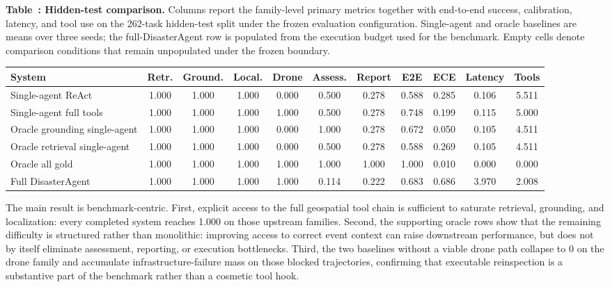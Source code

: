 \documentclass{article}
\begin{document}
\label{tab:main-results}
\begin{center}
    \scriptsize
    \setlength{\tabcolsep}{2.5pt}
    \textbf{Table~\thetable: Hidden-test comparison.} Columns report the family-level primary metrics together with end-to-end success, calibration, latency, and tool use on the 262-task hidden-test split under the frozen evaluation configuration. Single-agent and oracle baselines are means over three seeds; the full-DisasterAgent row is populated from the execution budget used for the benchmark. Empty cells denote comparison conditions that remain unpopulated under the frozen boundary.
    \vspace{0.35em}

    \begin{tabular}{lcccccccccc}
        \toprule
        System & Retr. & Ground. & Local. & Drone & Assess. & Report & E2E & ECE & Latency & Tools \\
        \midrule
        Single-agent ReAct & 1.000 & 1.000 & 1.000 & 0.000 & 0.500 & 0.278 & 0.588 & 0.285 & 0.106 & 5.511 \\
        Single-agent full tools & 1.000 & 1.000 & 1.000 & 1.000 & 0.500 & 0.278 & 0.748 & 0.199 & 0.115 & 5.000 \\
        Oracle grounding single-agent & 1.000 & 1.000 & 1.000 & 0.000 & 1.000 & 0.278 & 0.672 & 0.050 & 0.105 & 4.511 \\
        Oracle retrieval single-agent & 1.000 & 1.000 & 1.000 & 0.000 & 0.500 & 0.278 & 0.588 & 0.269 & 0.105 & 4.511 \\
        Oracle all gold & 1.000 & 1.000 & 1.000 & 1.000 & 1.000 & 1.000 & 1.000 & 0.010 & 0.000 & 0.000 \\
        Full DisasterAgent & 1.000 & 1.000 & 1.000 & 1.000 & 0.114 & 0.222 & 0.683 & 0.686 & 3.970 & 2.008 \\
        \bottomrule
    \end{tabular}
\end{center}

The main result is benchmark-centric. First, explicit access to the full geospatial tool chain is sufficient to saturate retrieval, grounding, and localization: every completed system reaches 1.000 on those upstream families. Second, the supporting oracle rows show that the remaining difficulty is structured rather than monolithic: improving access to correct event context can raise downstream performance, but does not by itself eliminate assessment, reporting, or execution bottlenecks. Third, the two baselines without a viable drone path collapse to 0 on the drone family and accumulate infrastructure-failure mass on those blocked trajectories, confirming that executable reinspection is a substantive part of the benchmark rather than a cosmetic tool hook.
\end{document}
